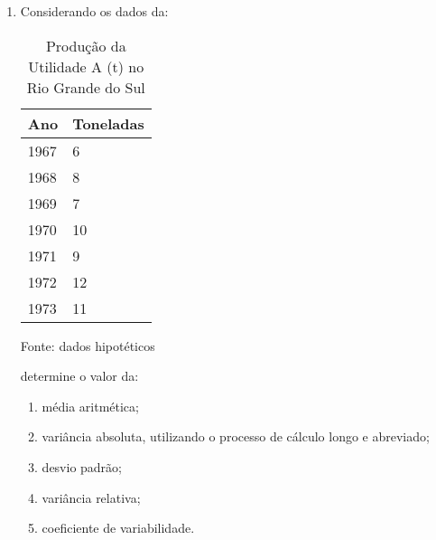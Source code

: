 \begin{enumerate}
\item Considerando os dados da:
	\begin{table}[!htb]
	\centering
	\caption{Produção da Utilidade A (t) no Rio Grande do Sul}
	\vspace{0.5cm}
	\begin{tabular}{ll}
	Ano & Toneladas \\
	\hline 
	1967 & 6  \\
	1968 & 8  \\
	1969 & 7  \\
	1970 & 10  \\
	1971 & 9  \\
	1972 & 12  \\
	1973 & 11  \\
	\end{tabular}
	 \newline \newline Fonte: dados hipotéticos
	\end{table}
	determine o valor da:
	\begin{enumerate}
		\item média aritmética;
		\item variância absoluta, utilizando o processo de cálculo longo e abreviado;
		\item desvio padrão;
		\item variância relativa;
		\item coeficiente de variabilidade.
	\end{enumerate}


\end{enumerate}
